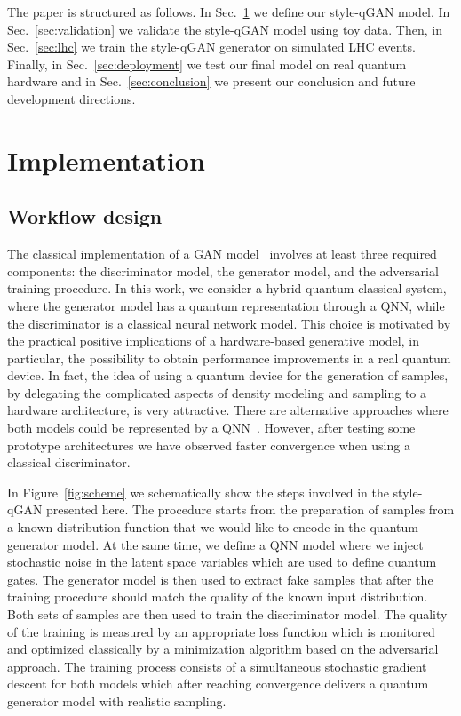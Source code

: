 \documentclass[twocolumn,preprintnumbers,superscriptaddress]{revtex4-2}
\begin{document}
The paper is structured as follows. In Sec.~\ref{sec:implementation} we define our style-qGAN model. In Sec.~\ref{sec:validation} we
validate the style-qGAN model using toy data. Then, in Sec.~\ref{sec:lhc} we train the style-qGAN
generator on simulated LHC events. Finally, in Sec.~\ref{sec:deployment} we test
our final model on real quantum hardware and in Sec.~\ref{sec:conclusion} we
present our conclusion and future development directions.

\section{Implementation}
\label{sec:implementation}

\subsection{Workflow design}

The classical implementation of a GAN model~\cite{goodfellow2014generative}
involves at least three required components: the discriminator model, the
generator model, and the adversarial training procedure. In this work, we
consider a hybrid quantum-classical system, where the generator model has a
quantum representation through a QNN, while the
discriminator is a classical neural network model. This choice is motivated by
the practical positive implications of a hardware-based generative model, in
particular, the possibility to obtain performance improvements in a real quantum
device. In fact, the idea of using a quantum device for the generation of
samples, by delegating the complicated aspects of density modeling and sampling
to a hardware architecture, is very attractive.
%
There are alternative approaches where both models could be represented by a
QNN~\cite{dallaire2018quantum, hu2019quantum, benedetti2019adversarial, romero2021variational, niu2021entangling}. However, after testing some prototype architectures we
have observed faster convergence when using a classical discriminator.

In Figure~\ref{fig:scheme} we schematically show the steps involved in the style-qGAN
presented here. The procedure starts from the preparation of samples from a
known distribution function that we would like to encode in the quantum
generator model. At the same time, we define a QNN model where
we inject stochastic noise in the latent space variables which are used to
define quantum gates. The generator model is then used to extract fake samples
that after the training procedure should match the quality of the known input
distribution. Both sets of samples are then used to train the discriminator
model. The quality of the training is measured by an appropriate loss function
which is monitored and optimized classically by a minimization algorithm based on
the adversarial approach. The training process consists of a simultaneous
stochastic gradient descent for both models which after reaching convergence
delivers a quantum generator model with realistic sampling.
\end{document}
